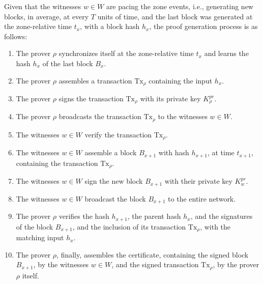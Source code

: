 Given that the witnesses $w \in W$ are pacing the zone events, i.e., generating new blocks, in average, at every $T$ units of time, and the last block was generated at the zone-relative time $t_x$, with a block hash $h_x$, the proof generation process is as follows:

\begin{enumerate}
    \item The prover $\rho$ synchronizes itself at the zone-relative time $t_x$ and learns the hash  $h_x$ of the last block $B_{x}$.
    \item The prover $\rho$ assembles a transaction $\text{Tx}_\rho$ containing the input $h_x$.
    \item The prover $\rho$ signs the transaction $\text{Tx}_\rho$ with its private key $K^{pr}_\rho$.
    \item The prover $\rho$ broadcasts the transaction $\text{Tx}_\rho$ to the witnesses $w \in W$.
    \item The witnesses $w \in W$ verify the transaction $\text{Tx}_\rho$.
    \item The witnesses $w \in W$ assemble a block $B_{x+1}$ with hash $h_{x+1}$, at time $t_{x+1}$, containing the transaction $\text{Tx}_\rho$.
    \item The witnesses $w \in W$ sign the new block $B_{x+1}$ with their private key $K^{pr}_w$.
    \item The witnesses $w \in W$ broadcast the block $B_{x+1}$ to the entire network.
    \item The prover $\rho$ verifies the hash $h_{x+1}$, the parent hash $h_{x}$, and the signatures of the block $B_{x+1}$, and the inclusion of its transaction $\text{Tx}_\rho$, with the matching input $h_{x}$.
    \item The prover $\rho$, finally, assembles the \pol{} certificate, containing the signed block $B_{x+1}$, by the witnesses $w \in W$, and the signed transaction $\text{Tx}_\rho$, by the prover $\rho$ itself.
\end{enumerate}


